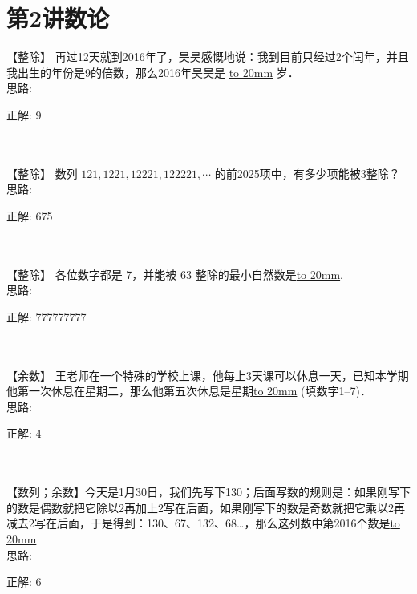 \section{第2讲\quad 数论}

\item {
    【整除】
    再过12天就到2016年了，昊昊感慨地说：我到目前只经过2个闰年，并且我出生的年份是9的倍数，那么2016年昊昊是 \underline{\hbox to 20mm{}} 岁． 
    \ifshowSolution
        \fangsong{}
        \\
        思路:

        正解: 9 
    \else
        \\ \\ \\
    \fi
}


\item {
    【整除】
    数列 $121, 1221, 12221, 122221,\cdots$ 的前2025项中，有多少项能被3整除？
    \ifshowSolution
        \fangsong{}
        \\
        思路:

        正解: 675
    \else
        \\ \\ \\
    \fi
}

\item {
    【整除】
    各位数字都是 7，并能被 63 整除的最小自然数是\underline{\hbox to 20mm{}}.
    \ifshowSolution
        \fangsong{}
        \\
        思路:

        正解: 777777777
    \else
        \\ \\ \\
    \fi
}


\item {
    【余数】
    王老师在一个特殊的学校上课，他每上3天课可以休息一天，已知本学期他第一次休息在星期二，那么他第五次休息是星期\underline{\hbox to 20mm{}} (填数字1--7)．
    \ifshowSolution
        \fangsong{}
        \\
        思路:

        正解: 4
    \else
        \\ \\ \\
    \fi
}

\item {
    【数列；余数】今天是1月30日，我们先写下130；后面写数的规则是：如果刚写下的数是偶数就把它除以2再加上2写在后面，如果刚写下的数是奇数就把它乘以2再减去2写在后面，于是得到：130、67、132、68…，那么这列数中第2016个数是\underline{\hbox to 20mm{}}
    \ifshowSolution
        \fangsong{}
        \\
        思路:

        正解:  6
    \else
        \\ \\ \\
    \fi
}

